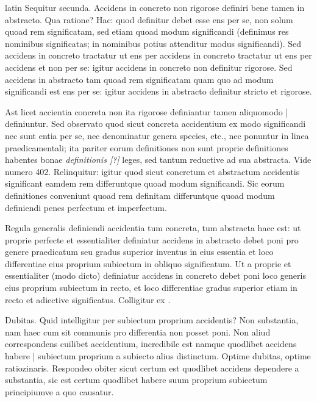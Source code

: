 \begin{otherlanguage*}{latin}
\pstart
Sequitur secunda. Accidens in concreto non rigorose definiri bene tamen in abstracto. Qua ratione? Hac:
quod definitur debet esse ens per se, non solum quoad rem significatam, sed etiam quoad modum significandi (definimus res nominibus significatas; in nominibus potius attenditur modus significandi). Sed accidens in concreto tractatur ut ens per accidens in concreto tractatur ut ens per accidens et non per se:
igitur accidens in concreto non definitur rigorose. Sed accidens in abstracto tam quoad rem significatam quam quo ad modum significandi est ens per se:
igitur accidens in abstracto definitur stricto et rigorose. 
\pend

\pstart
Ast licet accientia concreta non ita rigorose definiantur tamen aliquomodo \textnormal{|} definiuntur. Sed observato quod sicut concreta accidentium ex modo significandi nec sunt entia per se, nec denominatur genera species, etc., nec ponuntur in linea praedicamentali; ita pariter eorum definitiones non sunt proprie definitiones habentes bonae \emph{definitionis [?]} leges, sed tantum reductive ad sua abstracta. Vide numero 402. Relinquitur:
igitur quod sicut concretum et abstractum accidentis significant eamdem rem differuntque quoad modum significandi. Sic eorum definitiones conveniunt quoad rem definitam differuntque quoad modum definiendi penes perfectum et imperfectum. 
\pend

\pstart
Regula generalis definiendi accidentia tum concreta, tum abstracta haec est:
ut proprie perfecte et essentialiter definiatur accidens in abstracto debet poni pro genere praedicatum seu gradus superior inventus in eius essentia et loco differentiae eius proprium subiectum in obliquo significatum. Ut a proprie et essentialiter (modo dicto) definiatur accidens in concreto debet poni loco generis eius proprium subiectum in recto, et loco differentiae gradus superior etiam in recto et adiective significatus. Colligitur ex . 
\pend

\pstart
Dubitas. Quid intelligitur per subiectum proprium accidentis? Non substantia, nam haec cum sit communis pro differentia non posset poni. Non aliud correspondens cuilibet accidentium, incredibile est namque quodlibet accidens habere \textnormal{|} subiectum proprium a subiecto alius distinctum. Optime dubitas, optime ratiozinaris. Respondeo obiter sicut certum est quodlibet accidens dependere a substantia, sic est certum quodlibet habere suum proprium subiectum principiumve a quo causatur. 
\pend


\end{otherlanguage*}
